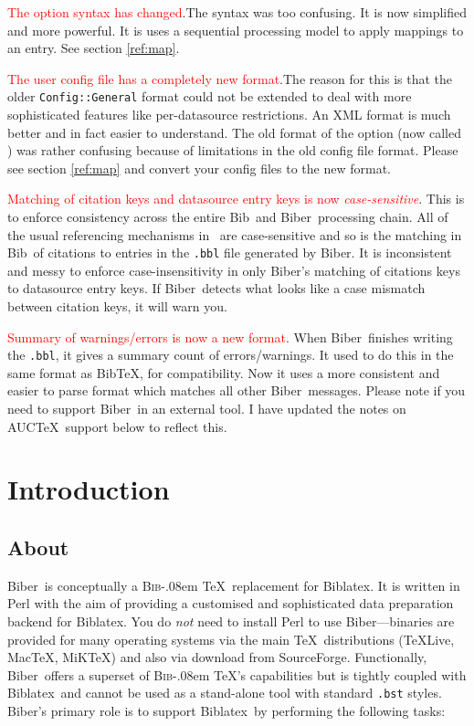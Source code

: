 \documentclass{ltxdockit}
\def\BibTeX{\textsc{Bib}\kern-.08em \TeX}
\newcommand*{\biber}{Biber\xspace}
\newcommand*{\biblatex}{Biblatex\xspace}
\begin{document}
\textcolor{red}{The  option syntax has changed}.The syntax
was too confusing. It is now simplified and more powerful. It is uses a
sequential processing model to apply mappings to an entry. See section
\ref{ref:map}.

\textcolor{red}{The user config file has a completely new format}.The
  reason for this is that the older \verb+Config::General+ format
  could not be extended to deal with more sophisticated features like
  per-datasource restrictions. An XML format is much better and in
  fact easier to understand. The old format of the  option
  (now called ) was rather confusing because
  of limitations in the old config file format. Please see section
  \ref{ref:map} and convert your config files to the new format.

\textcolor{red}{Matching of citation keys and datasource entry keys is now
  \emph{case-sensitive}}. This is to enforce consistency across the entire
Bib\latex\ and \biber\ processing chain. All of the usual referencing
mechanisms in \latex\ are case-sensitive and so is the matching in
Bib\latex\ of citations to entries in the \texttt{.bbl} file generated by
\biber. It is inconsistent and messy to enforce case-insensitivity in only
\biber's matching of citations keys to datasource entry keys. If \biber\
detects what looks like a case mismatch between citation keys, it will warn
you.

\noindent \textcolor{red}{Summary of warnings/errors is now a new format}.
When \biber\ finishes writing the \verb+.bbl+, it gives a summary
count of errors/warnings. It used to do this in the same format as
Bib\TeX, for compatibility. Now it uses a more consistent and easier
to parse format which matches all other \biber\ messages. Please note
if you need to support \biber\ in an external tool. I have updated the
notes on AUC\TeX\ support below to reflect this.

\section{Introduction}\label{int}

\subsection{About}

\biber\ is conceptually a \BibTeX\ replacement for
\biblatex. It is written in Perl with the aim of providing a
customised and sophisticated data preparation backend for \biblatex.
You do \emph{not} need to install Perl to use \biber---binaries
are provided for many operating systems via the main \TeX\
distributions (\TeX Live, Mac\TeX, MiK\TeX) and also via download from SourceForge.
Functionally, \biber\ offers a superset of \BibTeX's capabilities but is
tightly coupled with \biblatex\ and cannot be used as a stand-alone tool
with standard \verb+.bst+ styles. \biber's primary role is to support
\biblatex\ by performing the following tasks:
\end{document}
